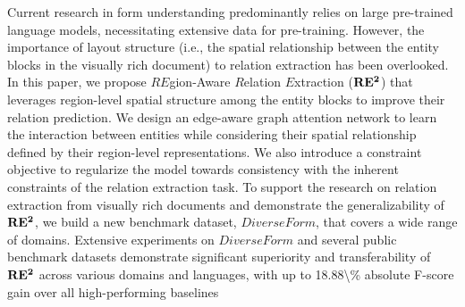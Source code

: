 Current research in form understanding predominantly relies on large pre-trained language models, necessitating extensive data for pre-training. However, the importance of layout structure (i.e., the spatial relationship between the entity blocks in the visually rich document) to relation extraction has been overlooked. In this paper, we propose ${RE}$gion-Aware ${R}$elation ${E}$xtraction ($\bf{RE^2}$) that leverages region-level spatial structure among the entity blocks to improve their relation prediction. We design an edge-aware graph attention network to learn the interaction between entities while considering their spatial relationship defined by their region-level representations. We also introduce a constraint objective to regularize the model towards consistency with the inherent constraints of the relation extraction task. To support the research on relation extraction from visually rich documents and demonstrate the generalizability of $\bf{RE^2}$, we build a new benchmark dataset, ${DiverseForm}$, that covers a wide range of domains. Extensive experiments on ${DiverseForm}$ and several public benchmark datasets demonstrate significant superiority and transferability of $\bf{RE^2}$ across various domains and languages, with up to 18.88\textbackslash{}\% absolute F-score gain over all high-performing baselines